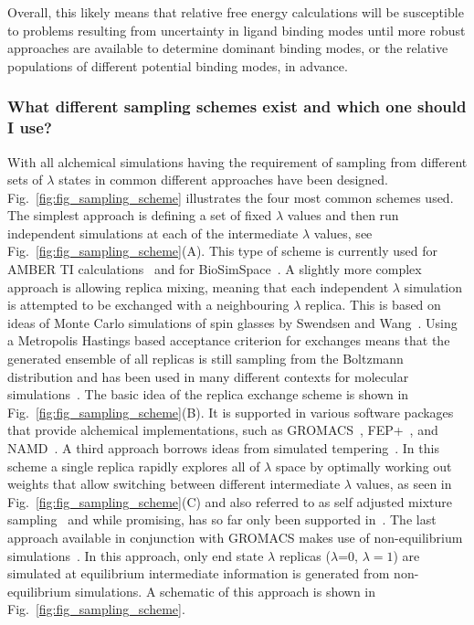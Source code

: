 \documentclass[9pt,bestpractices]{livecoms}
\begin{document}
Overall, this likely means that relative free energy calculations will be susceptible to problems resulting from uncertainty in ligand binding modes until more robust approaches are available to determine dominant binding modes, or the relative populations of different potential binding modes, in advance.

\subsubsection{What different sampling schemes exist and which one should I use?}
With all alchemical simulations having the requirement of sampling from different sets of $\lambda$ states in common different approaches have been designed. Fig.~\ref{fig:fig_sampling_scheme} illustrates the four most common schemes used. The simplest approach is defining a set of fixed $\lambda$ values and then run independent simulations at each of the intermediate $\lambda$ values, see Fig.~\ref{fig:fig_sampling_scheme}(A). This type of scheme is currently used for AMBER TI calculations~\cite{song2019} and for BioSimSpace~\cite{hedges2019biosimspace}. A slightly more complex approach is allowing replica mixing, meaning that each independent $\lambda$ simulation is attempted to be exchanged with a neighbouring $\lambda$ replica. This is based on ideas of Monte Carlo simulations of spin glasses by Swendsen and Wang~\cite{wendsen1986replica}. Using a Metropolis Hastings based acceptance criterion for exchanges means that the generated ensemble of all replicas is still sampling from the Boltzmann distribution and has been used in many different contexts for molecular simulations~\cite{sugita2000multidimensionala,sugita1999replicaexchangea, woods2003developmenta, jiang2010free}. The basic idea of the replica exchange scheme is shown in Fig.~\ref{fig:fig_sampling_scheme}(B). It is supported in various software packages that provide alchemical implementations, such as GROMACS~\cite{aldeghi2015accurate}, FEP+~\cite{wang2015accurate}, and NAMD~\cite{jiang2019computing}. A third approach borrows ideas from simulated tempering~\cite{marinari1992simulateda}. In this scheme a single replica rapidly explores all of $\lambda$ space by optimally working out weights that allow switching between different intermediate $\lambda$ values, as seen in Fig.~\ref{fig:fig_sampling_scheme}(C) and also referred to as self adjusted mixture sampling~\cite{lyubartsev1992newa, li2007simulated, tan2017optimally} and while promising, has so far only been supported in~\cite{andrearizzi2019choderalab}. The last approach available in conjunction with GROMACS makes use of non-equilibrium simulations~\cite{aldeghi2018accurate}. In this approach, only end state $\lambda$ replicas ($\lambda$=0, $\lambda=1$) are simulated at equilibrium intermediate information is generated from non-equilibrium simulations. A schematic of this approach is shown in Fig.~\ref{fig:fig_sampling_scheme}. 
\end{document}
